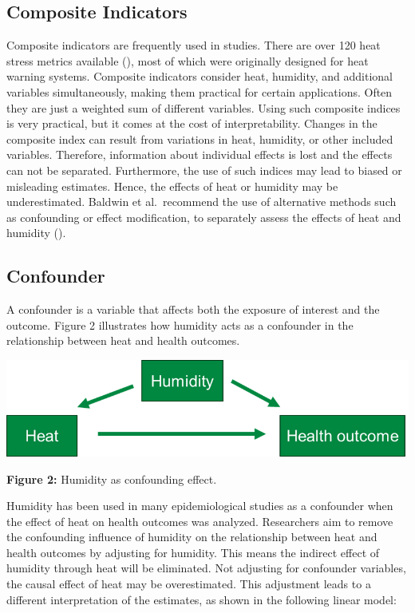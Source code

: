 \documentclass[
]{krantz}
\begin{document}
\subsection{Composite Indicators}\label{composite-indicators}

Composite indicators are frequently used in studies. There are over 120 heat stress metrics available (\citet{buzan}), most of which were originally designed for heat warning systems. Composite indicators consider heat, humidity, and additional variables simultaneously, making them practical for certain applications. Often they are just a weighted sum of different variables. Using such composite indices is very practical, but it comes at the cost of interpretability. Changes in the composite index can result from variations in heat, humidity, or other included variables. Therefore, information about individual effects is lost and the effects can not be separated. Furthermore, the use of such indices may lead to biased or misleading estimates. Hence, the effects of heat or humidity may be underestimated. Baldwin et al.~recommend the use of alternative methods such as confounding or effect modification, to separately assess the effects of heat and humidity (\citet{bald}).

\subsection{Confounder}\label{confounder}

A confounder is a variable that affects both the exposure of interest and the outcome. Figure 2 illustrates how humidity acts as a confounder in the relationship between heat and health outcomes.

\begin{center}\includegraphics[width=0.8\linewidth]{Confounder} \end{center}

\textbf{Figure 2:} Humidity as confounding effect.

Humidity has been used in many epidemiological studies as a confounder when the effect of heat on health outcomes was analyzed. Researchers aim to remove the confounding influence of humidity on the relationship between heat and health outcomes by adjusting for humidity. This means the indirect effect of humidity through heat will be eliminated. Not adjusting for confounder variables, the causal effect of heat may be overestimated. This adjustment leads to a different interpretation of the estimates, as shown in the following linear model:
\end{document}
